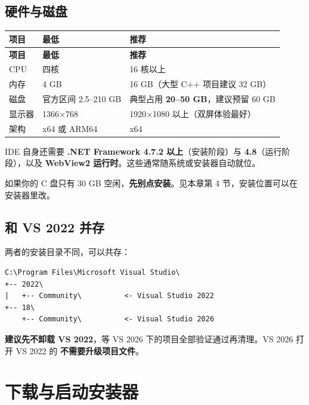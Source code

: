 \subsection{硬件与磁盘}
\begin{longtable}{L{2.2cm}L{4.0cm}L{8.4cm}}
\toprule
\textbf{项目} & \textbf{最低} & \textbf{推荐} \\
\midrule
\endfirsthead
\toprule
\textbf{项目} & \textbf{最低} & \textbf{推荐} \\
\midrule
\endhead
\bottomrule
\endlastfoot
CPU & 四核 & 16 核以上 \\
内存 & 4 GB & 16 GB（大型 C++ 项目建议 32 GB） \\
磁盘 & 官方区间 2.5--210 GB & 典型占用 \textbf{20--50 GB}，建议预留 60 GB \\
显示器 & 1366$\times$768 & 1920$\times$1080 以上（双屏体验最好） \\
架构 & x64 或 ARM64 & x64 \\
\end{longtable}

IDE 自身还需要 \textbf{.NET Framework 4.7.2 以上}（安装阶段）与 \textbf{4.8}（运行阶段），以及 \textbf{WebView2 运行时}。这些通常随系统或安装器自动就位。

\begin{keybox}[实战场景]
如果你的 C 盘只有 30 GB 空闲，\textbf{先别点安装}。见本章第 4 节，安装位置可以在安装器里改。
\end{keybox}

\subsection{和 VS 2022 并存}
两者的安装目录不同，可以共存：

\begin{lstlisting}[style=textstyle]
C:\Program Files\Microsoft Visual Studio\
+-- 2022\
|   +-- Community\          <- Visual Studio 2022
+-- 18\
    +-- Community\          <- Visual Studio 2026
\end{lstlisting}

\textbf{建议先不卸载 VS 2022}，等 VS 2026 下的项目全部验证通过再清理。VS 2026 打开 VS 2022 的  \textbf{不需要升级项目文件}。

\section{下载与启动安装器}
